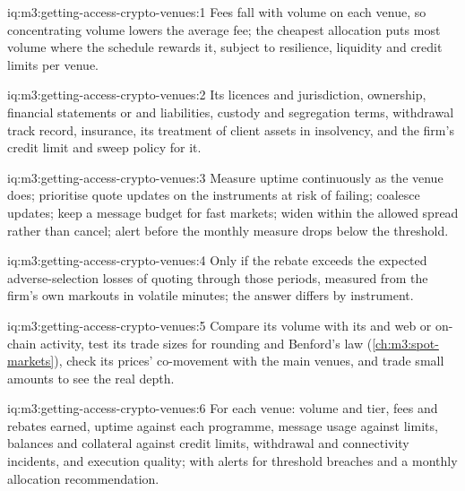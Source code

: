 \begin{solution}{iq:m3:getting-access-crypto-venues:1}
Fees fall with volume on each venue, so concentrating volume lowers the average fee; the cheapest allocation puts most volume where the schedule rewards
it, subject to resilience, liquidity and credit limits per venue.
\end{solution}

\begin{solution}{iq:m3:getting-access-crypto-venues:2}
Its licences and jurisdiction, ownership, financial statements or  and liabilities, custody and segregation terms, withdrawal track
record, insurance, its treatment of client assets in insolvency, and the firm's credit limit and sweep policy for it.
\end{solution}

\begin{solution}{iq:m3:getting-access-crypto-venues:3}
Measure uptime continuously as the venue does; prioritise quote updates on the instruments at risk of failing; coalesce updates; keep a message budget
for fast markets; widen within the allowed spread rather than cancel; alert before the monthly measure drops below the threshold.
\end{solution}

\begin{solution}{iq:m3:getting-access-crypto-venues:4}
Only if the rebate exceeds the expected adverse-selection losses of quoting through those periods, measured from the firm's own markouts in volatile
minutes; the answer differs by instrument.
\end{solution}

\begin{solution}{iq:m3:getting-access-crypto-venues:5}
Compare its volume with its  and web or on-chain activity, test its trade sizes for rounding and Benford's law
(\cref{ch:m3:spot-markets}), check its prices' co-movement with the main venues, and trade small amounts to see the real depth.
\end{solution}

\begin{solution}{iq:m3:getting-access-crypto-venues:6}
For each venue: volume and tier, fees and rebates earned, uptime against each programme, message usage against limits, balances and collateral
against credit limits, withdrawal and connectivity incidents, and execution quality; with alerts for threshold breaches and a monthly allocation
recommendation.
\end{solution}
